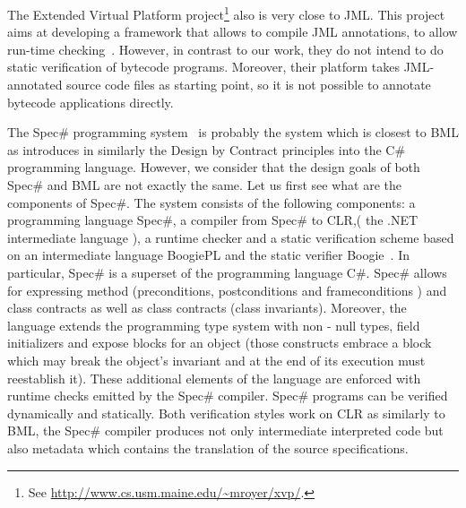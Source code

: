 
The Extended Virtual Platform project\footnote{See \url{http://www.cs.usm.maine.edu/~mroyer/xvp/}.} also is very close to JML.
 This project aims at developing a framework that allows to compile JML annotations, to
allow run-time checking~\cite{AlagicXVP05}. However, in contrast to
our work, they do not intend to do static verification of bytecode
programs. Moreover, their platform takes JML-annotated source code
files as starting point, so it is not possible to annotate bytecode
applications directly.

The Spec\# programming system~\cite{BLS04sp} is probably the system which is closest to BML as  
introduces in similarly the Design by Contract principles into the C\#
programming language. However, we consider that the design goals of both Spec\# and BML 
are not exactly the same.
 Let us first see what are the components of Spec\#. %
 The system consists of the following components:  a programming language Spec\#, a compiler from Spec\# to 
 CLR,( the .NET intermediate language  \cite{B02EN}), a runtime checker and a static verification scheme
 based on an intermediate language BoogiePL and the static verifier Boogie~\cite{BarnettCDJL05}.
 In particular, Spec\# is a superset of the programming language  C\#. Spec\# allows for expressing method (preconditions, postconditions and frameconditions )
 and class contracts as well as class contracts (class invariants). Moreover, the language extends the programming type system with non - null types,
 field initializers and expose blocks for an object (those constructs embrace a  block which  may break the object's invariant and at the end of its execution must reestablish it).
 These additional elements of the language are enforced with runtime checks emitted by the Spec\# compiler. 
  Spec\# programs can be verified dynamically and statically. 
 Both verification styles work on  CLR as similarly to BML, the Spec\# compiler produces not only intermediate interpreted code but also metadata which contains 
 the translation of the source specifications. %
